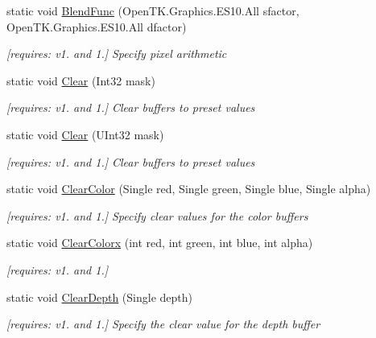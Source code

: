 \begin{DoxyCompactItemize}
static void \hyperlink{class_open_t_k_1_1_graphics_1_1_e_s10_1_1_g_l_abc8f0073848eb5bd1894d87dbcafe77c}{Blend\-Func} (Open\-T\-K.\-Graphics.\-E\-S10.\-All sfactor, Open\-T\-K.\-Graphics.\-E\-S10.\-All dfactor)
\begin{DoxyCompactList}\small\item\em \mbox{[}requires\-: v1. and 1.\mbox{]} Specify pixel arithmetic \end{DoxyCompactList}\item 
static void \hyperlink{class_open_t_k_1_1_graphics_1_1_e_s10_1_1_g_l_a8e85f847e4edd7078fbc0ca6410c6f6f}{Clear} (Int32 mask)
\begin{DoxyCompactList}\small\item\em \mbox{[}requires\-: v1. and 1.\mbox{]} Clear buffers to preset values \end{DoxyCompactList}\item 
static void \hyperlink{class_open_t_k_1_1_graphics_1_1_e_s10_1_1_g_l_a768065d3b15ad5fd6d6d7d9a40af7439}{Clear} (U\-Int32 mask)
\begin{DoxyCompactList}\small\item\em \mbox{[}requires\-: v1. and 1.\mbox{]} Clear buffers to preset values \end{DoxyCompactList}\item 
static void \hyperlink{class_open_t_k_1_1_graphics_1_1_e_s10_1_1_g_l_a56d96591a79d2ea2bdffc1f548f61a2e}{Clear\-Color} (Single red, Single green, Single blue, Single alpha)
\begin{DoxyCompactList}\small\item\em \mbox{[}requires\-: v1. and 1.\mbox{]} Specify clear values for the color buffers \end{DoxyCompactList}\item 
static void \hyperlink{class_open_t_k_1_1_graphics_1_1_e_s10_1_1_g_l_a5f44e6cbbba6583d06509d48636b7d74}{Clear\-Colorx} (int red, int green, int blue, int alpha)
\begin{DoxyCompactList}\small\item\em \mbox{[}requires\-: v1. and 1.\mbox{]}\end{DoxyCompactList}\item 
static void \hyperlink{class_open_t_k_1_1_graphics_1_1_e_s10_1_1_g_l_a139d53ccea5dc994f3f974008b983a2e}{Clear\-Depth} (Single depth)
\begin{DoxyCompactList}\small\item\em \mbox{[}requires\-: v1. and 1.\mbox{]} Specify the clear value for the depth buffer \end{DoxyCompactList}\item 

\end{DoxyCompactItemize}

